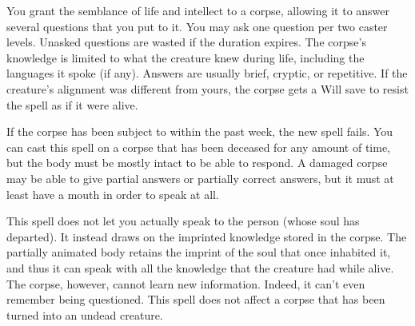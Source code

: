 \spelleffect You grant the semblance of life and intellect to a corpse, allowing it to answer several questions that you put to it. You may ask one question per two caster levels. Unasked questions are wasted if the duration expires. The corpse's knowledge is limited to what the creature knew during life, including the languages it spoke (if any). Answers are usually brief, cryptic, or repetitive. If the creature's alignment was different from yours, the corpse gets a Will save to resist the spell as if it were alive.
\par If the corpse has been subject to  within the past week, the new spell fails. You can cast this spell on a corpse that has been deceased for any amount of time, but the body must be mostly intact to be able to respond. A damaged corpse may be able to give partial answers or partially correct answers, but it must at least have a mouth in order to speak at all.
\par This spell does not let you actually speak to the person (whose soul has departed). It instead draws on the imprinted knowledge stored in the corpse. The partially animated body retains the imprint of the soul that once inhabited it, and thus it can speak with all the knowledge that the creature had while alive. The corpse, however, cannot learn new information. Indeed, it can't even remember being questioned.
\spellnotes This spell does not affect a corpse that has been turned into an undead creature.

